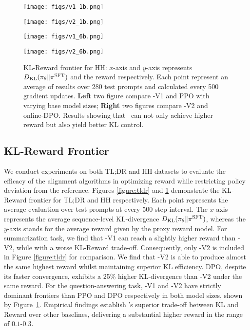\documentclass{article} %
\newcommand{\algn}{\text{P3O}}
\begin{document}
\begin{figure}[t]
  \centering
  \begin{minipage}[b]{0.52\textwidth}
    \texttt{[image: figs/v1\_1b.png]}
  \end{minipage}\hspace{-20pt}
  \begin{minipage}[b]{0.52\textwidth}
    \texttt{[image: figs/v2\_1b.png]}
  \end{minipage}

    \vspace{-6pt}

  \begin{minipage}[b]{0.52\textwidth}
    \texttt{[image: figs/v1\_6b.png]}
  \end{minipage}\hspace{-20pt}
  \begin{minipage}[b]{0.52\textwidth}
    \texttt{[image: figs/v2\_6b.png]}
  \end{minipage}
  \caption{KL-Reward frontier for HH: $x$-axis and $y$-axis represents $D_{\mathrm{KL}}(\pi_\theta\|\pi^{\text{SFT}})$ and the reward respectively. Each point represent an average of results over 280 test prompts and calculated every 500 gradient updates. \textbf{Left} two figure compare \algn-V1 and PPO with varying base model sizes; \textbf{Right} two figures compare \algn-V2 and online-DPO. Results showing that \algn\ can not only achieve higher reward but also yield better KL control.}
  \label{figure:hh}
  \vspace{-15pt}
\end{figure}

\subsection{KL-Reward Frontier} We conduct experiments on both TL;DR and HH datasets to evaluate the efficacy of the alignment algorithms in optimizing reward while restricting policy deviation from the reference. Figures \ref{figure:tldr} and \ref{figure:hh} demonstrate the KL-Reward frontier for TL;DR and HH respectively. Each point represents the average evaluation over test prompts at every 500-step interval. The $x$-axis represents the average sequence-level KL-divergence $D_{\mathrm{KL}}(\pi_\theta\|\pi^{\text{SFT}})$, whereas the $y$-axis stands for the average reward given by the proxy reward model. 
For summarization task, we find that \algn-V1 can reach a slightly higher reward than \algn-V2, while with a worse KL-Reward trade-off. Consequently, only \algn-V2 is included in Figure \ref{figure:tldr} for comparison. We find that \algn-V2 is able to produce almost the same highest reward whilst maintaining superior KL efficiency. DPO, despite its faster convergence, exhibits a 25\% higher KL-divergence than \algn-V2 under the same reward. For the question-answering task, \algn-V1 and \algn-V2 have strictly dominant frontiers than PPO and DPO respectively in both model sizes, shown by Figure~\ref{figure:hh}. Empirical findings establish \algn's superior trade-off between KL and Reward over other baselines, delivering a substantial higher reward in the range of $0.1$-$0.3$.
\end{document}
